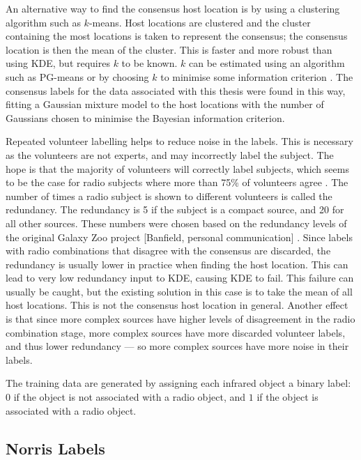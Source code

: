     An alternative way to find the consensus host location is by using a
    clustering algorithm such as $k$-means. Host locations are clustered and
    the cluster containing the most locations is taken to represent the
    consensus; the consensus location is then the mean of the cluster. This is
    faster and more robust than using KDE, but requires $k$ to be known. $k$
    can be estimated using an algorithm such as PG-means \citep{hamerly07} or by
    choosing $k$ to minimise some information criterion .
    The consensus labels for the data associated with this thesis were found in
    this way, fitting a Gaussian mixture model to the host locations with the
    number of Gaussians chosen to minimise the Bayesian information criterion.

    Repeated volunteer labelling helps to reduce noise in the labels. This is
    necessary as the volunteers are not experts, and may incorrectly label the
    subject. The hope is that the majority of volunteers will correctly label
    subjects, which seems to be the case for radio subjects where more than
    75\% of volunteers agree \citep{banfield15}. The number of times a radio
    subject is shown to different volunteers is called the redundancy. The
    redundancy is 5 if the subject is a compact source, and 20 for all other
    sources. These numbers were chosen based on the redundancy levels of the
    original Galaxy Zoo project [Banfield, personal communication] . Since labels with radio combinations that disagree with
    the consensus are discarded, the redundancy is usually lower in practice
    when finding the host location. This can lead to very low redundancy input
    to KDE, causing KDE to fail. This failure can usually be caught, but the
    existing solution in this case is to take the mean of all host locations.
    This is not the consensus host location in general. Another effect is that
    since more complex sources have higher levels of disagreement in the radio
    combination stage, more complex sources have more discarded volunteer
    labels, and thus lower redundancy --- so more complex sources have more
    noise in their labels.

    The training data are generated by assigning each infrared object a binary label: $0$ if the object is not associated with a radio object, and $1$ if the object is associated with a radio object.

  \subsection{Norris Labels}
  \label{sec:norris}


